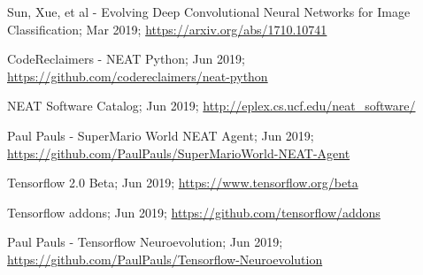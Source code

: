 \documentclass[journal, a4paper]{IEEEtran}
\begin{document}
\begin{thebibliography}{5}
    Sun, Xue, et al - Evolving Deep Convolutional Neural Networks for Image Classification; Mar 2019;
    \url{https://arxiv.org/abs/1710.10741}

    CodeReclaimers - NEAT Python; Jun 2019;
    \url{https://github.com/codereclaimers/neat-python}

    NEAT Software Catalog; Jun 2019;
    \url{http://eplex.cs.ucf.edu/neat_software/}

    Paul Pauls - SuperMario World NEAT Agent; Jun 2019;
    \url{https://github.com/PaulPauls/SuperMarioWorld-NEAT-Agent}

    Tensorflow 2.0 Beta; Jun 2019;
    \url{https://www.tensorflow.org/beta}

    Tensorflow addons; Jun 2019;
    \url{https://github.com/tensorflow/addons}

    Paul Pauls - Tensorflow Neuroevolution; Jun 2019;
    \url{https://github.com/PaulPauls/Tensorflow-Neuroevolution}

\end{thebibliography}
\end{document}

